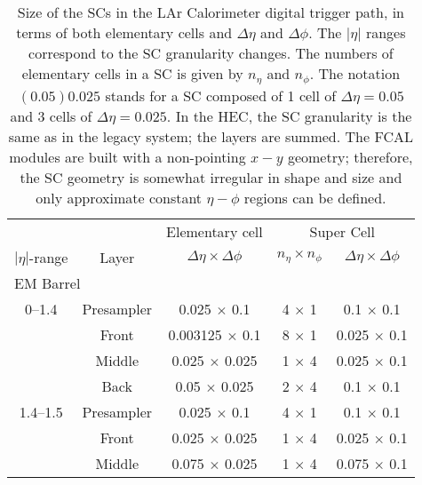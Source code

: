 \documentclass[cernpreprint, atlasdraft=false, UKenglish,british,orcidlogo, texmf, orcidlogo]{atlasdoc}
\begin{document}
\begin{table}[p]
\caption{Size of the \glspl{SC} in the \gls{LAr} Calorimeter digital trigger path, in terms of both elementary cells and $\Delta \eta$ and $\Delta \phi$. The $|\eta|$ ranges correspond to the \gls{SC} granularity changes. The numbers of elementary cells in a \gls{SC} is given by $n_\eta$ and $n_\phi$. The notation $(0.05)0.025$ stands for a \gls{SC} composed of 1 cell of $\Delta \eta =0.05$ and 3 cells of $\Delta \eta= 0.025$. In the \gls{HEC}, the \gls{SC} granularity is the same as in the legacy system; the layers are summed. The \gls{FCAL} modules are built with a non-pointing $x-y$ geometry; therefore, the \gls{SC} geometry is somewhat irregular in shape and size and only approximate constant $\eta-\phi$ regions can be defined.}
\label{tab:LArSuperCells}
\begin{center}
 
\begin{tabular}{|c|c||c||c|c|}
\hline
 
& &Elementary cell&\multicolumn{2}{c|}{Super Cell} \\ \cline{3-5}
$|\eta|$-range &Layer & $\Delta\eta \times \Delta\phi$ & $n_\eta \times n_\phi$ &$\Delta\eta \times \Delta\phi$ \\
\hline \hline
\multicolumn{5}{|l|}{\gls{EM} Barrel} \\ \hline
0--1.4   & Presampler & 0.025 $\times$ 0.1    & 4 $\times$ 1 & 0.1 $\times$ 0.1 \\
& Front      & 0.003125 $\times$ 0.1 & 8 $\times$ 1 & 0.025 $\times$ 0.1  \\
& Middle     & 0.025 $\times$ 0.025  & 1 $\times$ 4 & 0.025 $\times$ 0.1\\
& Back       & 0.05  $\times$ 0.025  & 2 $\times$ 4 & 0.1 $\times$ 0.1 \\
\hline
1.4--1.5   & Presampler & 0.025 $\times$ 0.1    & 4 $\times$ 1 & 0.1 $\times$ 0.1 \\
&Front       & 0.025 $\times$ 0.025 & 1 $\times$ 4 & 0.025 $\times$ 0.1   \\
& Middle    & 0.075 $\times$ 0.025  & 1 $\times$ 4 & 0.075 $\times$ 0.1  \\
\hline
 

\end{tabular}
\end{center}
\end{table}
\end{document}
